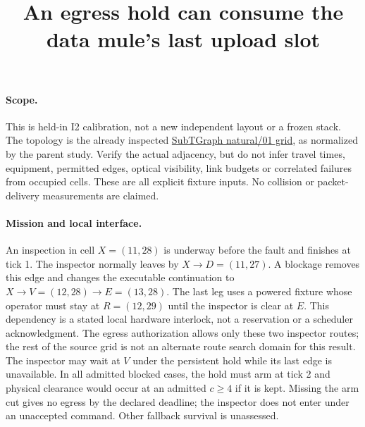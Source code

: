 \documentclass[11pt]{article}
\title{An egress hold can consume the data mule's last upload slot}
\author{}\date{}
\begin{document}
\maketitle

\paragraph{Scope.} This is held-in I2 calibration, not a new independent
layout or a frozen stack. The topology is the already inspected
\href{https://github.com/LTU-RAI/SubTGraph/tree/21a1bcabf37c8f2f6f236ba40b916094d9903b5b/benchmark}{SubTGraph natural/01 grid},
as normalized by the parent study. Verify the actual adjacency, but do not
infer travel times, equipment, permitted edges, optical visibility, link
budgets or correlated failures from occupied cells. These are all explicit
fixture inputs. No collision or packet-delivery measurements are claimed.

\paragraph{Mission and local interface.}
An inspection in cell \(X=(11,28)\) is underway before the fault
and finishes at tick 1. The inspector normally leaves by \(X\to D=(11,27)\).
A blockage removes this edge and changes the executable continuation to
\(X\to V=(12,28)\to E=(13,28)\). The last leg uses a powered fixture
whose operator must stay at \(R=(12,29)\) until the inspector is clear at
\(E\). This dependency is a stated local hardware interlock, not a
reservation or a scheduler acknowledgment. The egress authorization
allows only these two inspector routes; the rest of the source grid is
not an alternate route search domain for this result. The inspector may
wait at \(V\) under the persistent hold while its last edge is unavailable.
In all admitted blocked cases, the hold must arm at tick 2 and physical
clearance would occur at an admitted \(c\ge4\) if it is kept. Missing the
arm cut gives no egress by the declared deadline; the inspector does not
enter under an unaccepted command. Other fallback survival is unassessed.
\end{document}

